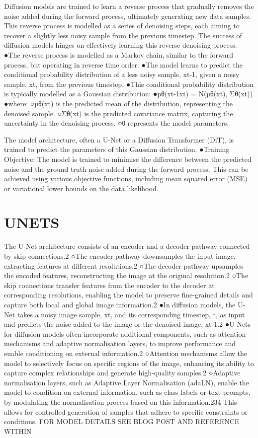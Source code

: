 \documentclass[
]{book}
\begin{document}
Diffusion models are trained to learn a reverse process that gradually removes the noise added during the forward process, ultimately generating new data samples. This reverse process is modelled as a series of denoising steps, each aiming to recover a slightly less noisy sample from the previous timestep. The success of diffusion models hinges on effectively learning this reverse denoising process.
●The reverse process is modelled as a Markov chain, similar to the forward process, but operating in reverse time order.
●The model learns to predict the conditional probability distribution of a less noisy sample, xt-1, given a noisy sample, xt, from the previous timestep.
●This conditional probability distribution is typically modelled as a Gaussian distribution:
●pθ(xt-1\textbar xt) = N(µθ(xt), Σθ(xt))
●where:
○µθ(xt) is the predicted mean of the distribution, representing the denoised sample.
○Σθ(xt) is the predicted covariance matrix, capturing the uncertainty in the denoising process.
○θ represents the model parameters.

The model architecture, often a U-Net or a Diffusion Transformer (DiT), is trained to predict the parameters of this Gaussian distribution.
●Training Objective: The model is trained to minimise the difference between the predicted noise and the ground truth noise added during the forward process. This can be achieved using various objective functions, including mean squared error (MSE) or variational lower bounds on the data likelihood.

\section{UNETS}\label{unets}

The U-Net architecture consists of an encoder and a decoder pathway connected by skip connections.2
○The encoder pathway downsamples the input image, extracting features at different resolutions.2
○The decoder pathway upsamples the encoded features, reconstructing the image at the original resolution.2
○The skip connections transfer features from the encoder to the decoder at corresponding resolutions, enabling the model to preserve fine-grained details and capture both local and global image information.2
●In diffusion models, the U-Net takes a noisy image sample, xt, and its corresponding timestep, t, as input and predicts the noise added to the image or the denoised image, xt-1.2
●U-Nets for diffusion models often incorporate additional components, such as attention mechanisms and adaptive normalisation layers, to improve performance and enable conditioning on external information.2
○Attention mechanisms allow the model to selectively focus on specific regions of the image, enhancing its ability to capture complex relationships and generate high-quality samples.2
○Adaptive normalisation layers, such as Adaptive Layer Normalisation (adaLN), enable the model to condition on external information, such as class labels or text prompts, by modulating the normalisation process based on this information.234 This allows for controlled generation of samples that adhere to specific constraints or conditions.
FOR MODEL DETAILS SEE BLOG POST AND REFERENCE WITHIN
\end{document}

